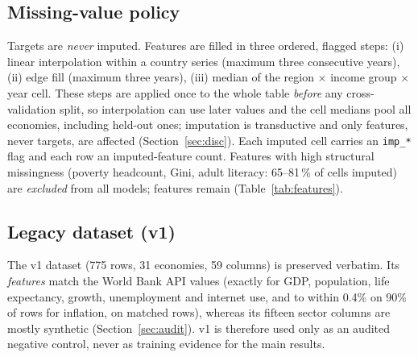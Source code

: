 \subsection{Missing-value policy}
Targets are \emph{never} imputed. Features are filled in three ordered, flagged steps: (i) linear interpolation within a country series (maximum three consecutive years), (ii) edge fill (maximum three years), (iii) median of the region $\times$ income group $\times$ year cell. These steps are applied once to the whole table \emph{before} any cross-validation split, so interpolation can use later values and the cell medians pool all economies, including held-out ones; imputation is transductive and only features, never targets, are affected (Section~\ref{sec:disc}). Each imputed cell carries an \texttt{imp\_*} flag and each row an imputed-feature count. Features with high structural missingness (poverty headcount, Gini, adult literacy: 65--81\,\% of cells imputed) are \emph{excluded} from all models; \NFeatModel{} features remain (Table~\ref{tab:features}).
\subsection{Legacy dataset (v1)}
The v1 dataset (775 rows, 31 economies, 59 columns) is preserved verbatim. Its \emph{features} match the World Bank API values (exactly for GDP, population, life expectancy, growth, unemployment and internet use, and to within 0.4\% on 90\% of rows for inflation, on \NLegacyMatched{} matched rows), whereas its fifteen sector columns are mostly synthetic (Section~\ref{sec:audit}). v1 is therefore used only as an audited negative control, never as training evidence for the main results.
